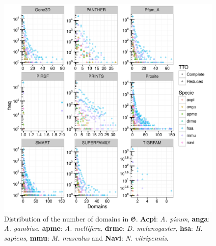 \documentclass[12pt]{article}
\begin{document}
\begin{figure}[ht!]
\begin{center}
\includegraphics[scale=0.8]{distributionGroupsDomains}
\caption{Distribution of the number of domains in $\boldsymbol{\mathfrak{G}}$. 
\textbf{Acpi}: \textit{A. pisum}, \textbf{anga}: \textit{A. gambiae}, 
\textbf{apme}: \textit{A. mellifera}, \textbf{drme}: \textit{D. melanogaster}, 
\textbf{hsa}: \textit{H. sapiens}, \textbf{mmu}: \textit{M. musculus} and 
\textbf{Navi}: \textit{N. vitripennis}.}
\label{fig:groups}
\end{center}
\end{figure}
\end{document}
